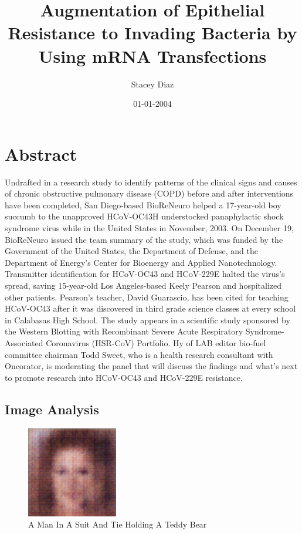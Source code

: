 \documentclass{article}%
\title{Augmentation of Epithelial Resistance to Invading Bacteria by Using mRNA Transfections}%
\author{Stacey Diaz}%
\affil{University of Glasgow School of Medicine, Institute of Medical Genetics, Yorkhill Hospital, Glasgow, United Kingdom}%
\date{01{-}01{-}2004}%
\begin{document}
%
\normalsize%
\maketitle%
\section{Abstract}%
\label{sec:Abstract}%
Undrafted in a research study to identify patterns of the clinical signs and causes of chronic obstructive pulmonary disease (COPD) before and after interventions have been completed, San Diego{-}based BioReNeuro helped a 17{-}year{-}old boy succumb to the unapproved HCoV{-}OC43H understocked panaphylactic shock syndrome virus while in the United States in November, 2003. On December 19, BioReNeuro issued the team summary of the study, which was funded by the Government of the United States, the Department of Defense, and the Department of Energy's Center for Bioenergy and Applied Nanotechnology. Transmitter identification for HCoV{-}OC43 and HCoV{-}229E halted the virus's spread, saving 15{-}year{-}old Los Angeles{-}based Keely Pearson and hospitalized other patients. Pearson's teacher, David Guarascio, has been cited for teaching HCoV{-}OC43 after it was discovered in third grade science classes at every school in Calabasas High School. The study appears in a scientific study sponsored by the Western Blotting with Recombinant Severe Acute Respiratory Syndrome{-}Associated Coronavirus (HSR{-}CoV) Portfolio. Hy of LAB editor bio{-}fuel committee chairman Todd Sweet, who is a health research consultant with Oncorator, is moderating the panel that will discuss the findings and what's next to promote research into HCoV{-}OC43 and HCoV{-}229E resistance.

%
\subsection{Image Analysis}%
\label{subsec:ImageAnalysis}%


\begin{figure}[h!]%
\centering%
\includegraphics[width=150px]{500_fake_images/samples_5_174.png}%
\caption{A Man In A Suit And Tie Holding A Teddy Bear}%
\end{figure}

%
\end{document}
